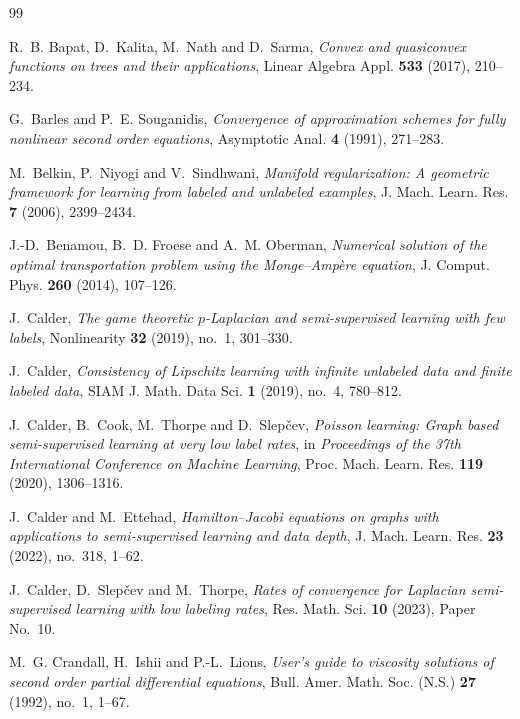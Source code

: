 \documentclass[reqno,11pt]{amsart}
\numberwithin{equation}{section}
\theoremstyle{definition}
\theoremstyle{remark}
\begin{document}
\begin{thebibliography}{99}  

R.~B. Bapat, D.~Kalita, M.~Nath and D.~Sarma, 
\emph{Convex and quasiconvex functions on trees and their applications}, 
Linear Algebra Appl. \textbf{533} (2017), 210--234.

G.~Barles and P.~E. Souganidis,
\emph{Convergence of approximation schemes for fully nonlinear second order equations},
Asymptotic Anal. \textbf{4} (1991), 271--283.

M.~Belkin, P.~Niyogi and V.~Sindhwani,
\emph{Manifold regularization: A geometric framework for learning from labeled and unlabeled examples},
J. Mach. Learn. Res. \textbf{7} (2006), 2399--2434.

J.-D.~Benamou, B.~D. Froese and A.~M. Oberman,
\emph{Numerical solution of the optimal transportation problem using the Monge--Amp\`ere equation},
J. Comput. Phys. \textbf{260} (2014), 107--126.

J.~Calder,
\emph{The game theoretic $p$-Laplacian and semi-supervised learning with few labels},
Nonlinearity \textbf{32} (2019), no.~1, 301--330.

J.~Calder,
\emph{Consistency of Lipschitz learning with infinite unlabeled data and finite labeled data},
SIAM J. Math. Data Sci. \textbf{1} (2019), no.~4, 780--812.

J.~Calder, B.~Cook, M.~Thorpe and D.~Slep{\v c}ev,
\emph{Poisson learning: Graph based semi-supervised learning at very low label rates},
in \emph{Proceedings of the 37th International Conference on Machine Learning},
Proc. Mach. Learn. Res. \textbf{119} (2020), 1306--1316.

J.~Calder and M.~Ettehad,
\emph{Hamilton--Jacobi equations on graphs with applications to semi-supervised learning and data depth},
J. Mach. Learn. Res. \textbf{23} (2022), no.~318, 1--62.

J.~Calder, D.~Slep{\v c}ev and M.~Thorpe,
\emph{Rates of convergence for Laplacian semi-supervised learning with low labeling rates},
Res. Math. Sci. \textbf{10} (2023), Paper No.~10.

M.~G. Crandall, H.~Ishii and P.-L.~Lions,
\emph{User's guide to viscosity solutions of second order partial differential equations},
Bull. Amer. Math. Soc. (N.S.) \textbf{27} (1992), no.~1, 1--67.


\end{thebibliography}
\end{document}
